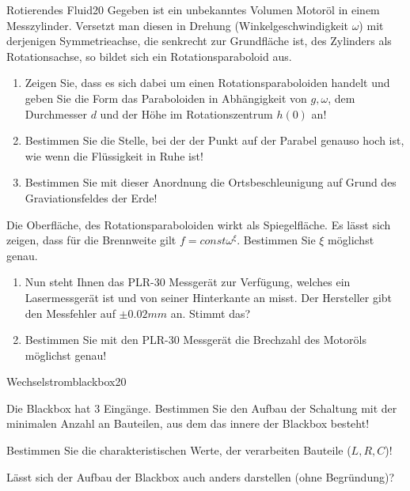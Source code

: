 \begin{problem}{Rotierendes Fluid}{20}
Gegeben ist ein unbekanntes Volumen Motoröl in einem Messzylinder. Versetzt man diesen in Drehung (Winkelgeschwindigkeit $\omega$) mit derjenigen Symmetrieachse, die senkrecht zur Grundfläche ist, des Zylinders als Rotationsachse, so bildet sich ein Rotationsparaboloid aus.
\begin{abcenum}
 \item
  \begin{enumerate} 
   \item Zeigen Sie, dass es sich dabei um einen Rotationsparaboloiden handelt und geben Sie die Form das Paraboloiden in Abhängigkeit von $g, \omega$, dem Durchmesser $d$ und der Höhe im Rotationszentrum $h(0)$ an!
   \item Bestimmen Sie die Stelle, bei der der Punkt auf der Parabel genauso hoch ist, wie wenn die Flüssigkeit in Ruhe ist!
   \item Bestimmen Sie mit dieser Anordnung die Ortsbeschleunigung auf Grund des Graviationsfeldes der Erde!
  \end{enumerate}
\item Die Oberfläche, des Rotationsparaboloiden wirkt als Spiegelfläche. Es lässt sich zeigen, dass für die Brennweite gilt $f=const\omega^{\xi}$. Bestimmen Sie $\xi$ möglichst genau.
\item
\begin{enumerate}
 \item Nun steht Ihnen das PLR-30 Messgerät zur Verfügung, welches ein Lasermessgerät ist und von seiner Hinterkante an misst. Der Hersteller gibt den Messfehler auf $\pm 0.02\unit{mm}$ an. Stimmt das?
 \item Bestimmen Sie mit den PLR-30 Messgerät die Brechzahl des Motoröls möglichst genau!
\end{enumerate}
\end{abcenum}
\end{problem}

\begin{problem}{Wechselstromblackbox}{20}
\begin{abcenum}
 \item Die Blackbox hat $3$ Eingänge. Bestimmen Sie den Aufbau der Schaltung mit der minimalen Anzahl an Bauteilen, aus dem das innere der Blackbox besteht!
 \item Bestimmen Sie die charakteristischen Werte, der verarbeiten Bauteile ($L, R, C$)!
 \item Lässt sich der Aufbau der Blackbox auch anders darstellen (ohne Begründung)?
\end{abcenum}
\end{problem}


% 
% 


